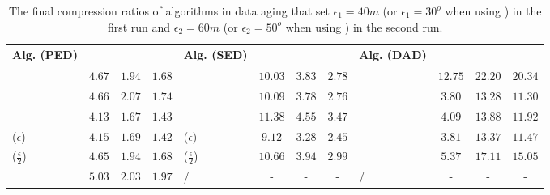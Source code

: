    	 	
\begin{table}
	\caption{\small The final compression ratios of algorithms in data aging that set $\epsilon_1=40m$ (or $\epsilon_1=30^o$ when using \dad) in the first run and $\epsilon_2=60m$ (or $\epsilon_2=50^o$ when using \dad) in the second run.}
	\centering
	\scriptsize
	\vspace{-1ex}
	\begin{tabular}{|l|c|c|c|l|c|c|c|l|c|c|c|}
		\hline
		\bf{Alg. (PED)}  &\ucar &\geolife &\mopsi & \bf{Alg. (SED)}  &\ucar &\geolife &\mopsi &\bf{Alg. (DAD)}  &\ucar &\geolife &\mopsi \\
		\hline  		
		{\dpa} &	$4.67$ & $1.94 $ &	$1.68$	&\dpa &$10.03$ &$3.83$ & $2.78 $ & \dpa	& $12.75$	& $22.20$	& $20.34 $ \\
		\hline
		{\tpa} &	$4.66$ & $	2.07 $ &	$1.74 $	&\tpa 	& $10.09$& $3.78$ &$2.76$ & \tpa	& $3.80$	& $13.28$	& $11.30$ \\
		\hline
		{\bqsa} &	$4.13$ & $1.67 $ &	$ 1.43 $	&\squishe &$11.38$ &$4.55$ & $3.47$ & \opwa	& $4.09$	& $13.88$	& $11.92$ \\
		\hline
		{\siped($\epsilon$)} &	$4.15 $ & $1.69 $ &	$1.42$	&\cised($\epsilon$) & $9.12$ &$3.28$ &$2.45 $ & \interval	& $3.81$	& $13.37$	& $11.47 $ \\
		\hline
		{\siped($\frac{\epsilon}{2}$)} &	$4.65 $ & $1.94$ &	$1.68$ &\cised($\frac{\epsilon}{2}$) &$10.66 $ & $3.94$ & $2.99 $& \intersec	& $5.37$	& $17.11$	& $15.05 $ \\
		\hline
		{\operb} &	$5.03$ & $2.03 $ &	$ 1.97 $	& / & - & -&- & / &- &- & - \\
		\hline
	\end{tabular}
	\label{tab:aging-cr}	
	\vspace{-2ex}
\end{table}

 	 	
   	 	
